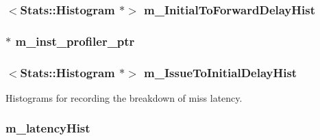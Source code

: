 \label{classProfiler_a4646ee2cafcbe46b66af5d8253eac92f}
\hypertarget{classProfiler_a0dbfb83f6edf61cad3d0aebdc89ed370}{
\subsubsection[{m\_\-InitialToForwardDelayHist}]{$<${\bf Stats::Histogram} $\ast$$>$ {\bf m\_\-InitialToForwardDelayHist}}}
\label{classProfiler_a0dbfb83f6edf61cad3d0aebdc89ed370}
\hypertarget{classProfiler_a32ef2b97dac1a15df5891cb079a0f1b3}{
\subsubsection[{m\_\-inst\_\-profiler\_\-ptr}]{$\ast$ {\bf m\_\-inst\_\-profiler\_\-ptr}}}
\label{classProfiler_a32ef2b97dac1a15df5891cb079a0f1b3}
\hypertarget{classProfiler_a503562ca3d885333c87da80d05ee612a}{
\subsubsection[{m\_\-IssueToInitialDelayHist}]{$<${\bf Stats::Histogram} $\ast$$>$ {\bf m\_\-IssueToInitialDelayHist}}}
\label{classProfiler_a503562ca3d885333c87da80d05ee612a}


Histograms for recording the breakdown of miss latency. \hypertarget{classProfiler_aeb3fc96d5f4638c5599ed141c6c6bda7}{
\subsubsection[{m\_\-latencyHist}]{ {\bf m\_\-latencyHist}}}
\label{classProfiler_aeb3fc96d5f4638c5599ed141c6c6bda7}


